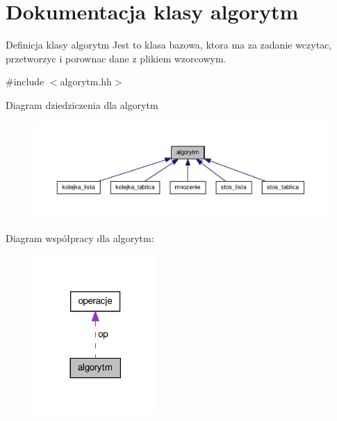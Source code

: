 \hypertarget{classalgorytm}{\section{\-Dokumentacja klasy algorytm}
\label{classalgorytm}
}


\-Definicja klasy algorytm \-Jest to klasa bazowa, ktora ma za zadanie wczytac, przetworzyc i porownac dane z plikiem wzorcowym.  




{\ttfamily \#include $<$algorytm.\-hh$>$}



\-Diagram dziedziczenia dla algorytm\nopagebreak
\begin{figure}[H]
\begin{center}
\leavevmode
\includegraphics[width=350pt]{classalgorytm__inherit__graph}
\end{center}
\end{figure}


\-Diagram współpracy dla algorytm\-:\nopagebreak
\begin{figure}[H]
\begin{center}
\leavevmode
\includegraphics[width=134pt]{classalgorytm__coll__graph}
\end{center}
\end{figure}
